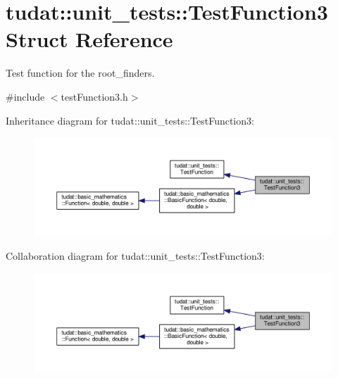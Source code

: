 \hypertarget{structtudat_1_1unit__tests_1_1TestFunction3}{}\section{tudat\+:\+:unit\+\_\+tests\+:\+:Test\+Function3 Struct Reference}
\label{structtudat_1_1unit__tests_1_1TestFunction3}


Test function for the root\+\_\+finders.  




{\ttfamily \#include $<$test\+Function3.\+h$>$}



Inheritance diagram for tudat\+:\+:unit\+\_\+tests\+:\+:Test\+Function3\+:
\nopagebreak
\begin{figure}[H]
\begin{center}
\leavevmode
\includegraphics[width=350pt]{structtudat_1_1unit__tests_1_1TestFunction3__inherit__graph}
\end{center}
\end{figure}


Collaboration diagram for tudat\+:\+:unit\+\_\+tests\+:\+:Test\+Function3\+:
\nopagebreak
\begin{figure}[H]
\begin{center}
\leavevmode
\includegraphics[width=350pt]{structtudat_1_1unit__tests_1_1TestFunction3__coll__graph}
\end{center}
\end{figure}
